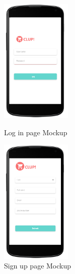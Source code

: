 \begin{figure}[H]
  \centering
  \includegraphics[width=0.3\textwidth,keepaspectratio]{images/6.png}
  \caption{Log in page Mockup}
  \centering
  \includegraphics[width=0.3\textwidth,keepaspectratio]{images/7.png}
  \caption{Sign up page Mockup}
\end{figure}
